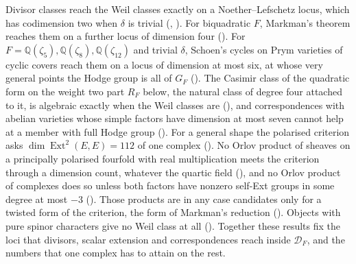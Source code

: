 \documentclass[11pt,reqno]{amsart}
\theoremstyle{plain}
\theoremstyle{definition}
\theoremstyle{remark}
\newcommand{\QQ}{\mathbb{Q}}
\newcommand{\cD}{\mathcal{D}}
\DeclareMathOperator{\Ext}{Ext}
\begin{document}
Divisor classes reach the Weil classes exactly on a Noether--Lefschetz locus,
which has codimension two when $\delta$ is trivial (,
). For biquadratic $F$, Markman's theorem reaches them
on a further locus of dimension four (). For
$F=\QQ(\zeta_{5}),\QQ(\zeta_{8}),\QQ(\zeta_{12})$ and trivial $\delta$,
Schoen's cycles on Prym varieties of cyclic covers reach them on a locus of
dimension at most six, at whose very general points the Hodge group is all of
$G_{F}$ (). The Casimir class of the quadratic form on
the weight two part $R_{F}$ below, the natural class of degree four attached
to it, is algebraic exactly when the Weil classes are
(), and correspondences with abelian varieties whose
simple factors have dimension at most seven cannot help at a member with full
Hodge group (). For a general shape the polarised
criterion asks $\dim\Ext^{2}(E,E)=112$ of one complex
(). No Orlov product of sheaves on a principally
polarised fourfold with real multiplication meets the criterion through a
dimension count, whatever the quartic field (),
and no Orlov product of complexes does so unless both factors have nonzero self-Ext
groups in some degree at most $-3$ (). Those products
are in any case candidates only for a twisted form of the criterion, the form
of Markman's reduction (). Objects with pure
spinor characters give no Weil class at all ().
Together these results fix the loci that
divisors, scalar extension and correspondences reach inside $\cD_{F}$, and
the numbers that one complex has to attain on the rest.
\end{document}
